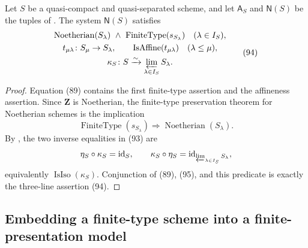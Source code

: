 \begin{proposition}
  \label{prop:nagata-noetherian-inverse-system}
  \lean{}

  Let $S$ be a quasi-compact and quasi-separated scheme, and let
  $\mathsf A_S$ and $\mathsf N(S)$ be the tuples of
  .  The system
  \(\mathsf N(S)\) satisfies
  \[
  \begin{gathered}
    \operatorname{Noetherian}(S_\lambda)
      \ \wedge\ \operatorname{FiniteType}(s_{S_\lambda})
      \quad(\lambda\in I_S),\\
    t_{\mu\lambda}\colon S_\mu\to S_\lambda,\qquad
      \operatorname{IsAffine}(t_{\mu\lambda})
      \quad(\lambda\leq\mu),\\
    \kappa_S\colon S\xrightarrow{\sim}
      \varprojlim_{\lambda\in I_S}S_\lambda.
  \end{gathered}                                                     \tag{94}
  \]
\end{proposition}

\begin{proof}
  Equation (89) contains the first finite-type assertion and the affineness
  assertion.  Since \(\mathbf Z\) is Noetherian, the finite-type
  preservation theorem for Noetherian schemes is the implication
  \[
    \operatorname{FiniteType}(s_{S_\lambda})
      \Longrightarrow\operatorname{Noetherian}(S_\lambda).         \tag{95}
  \]
  By , the two inverse equalities in
  (93) are
  \[
    \eta_S\circ\kappa_S=\operatorname{id}_S,
    \qquad
    \kappa_S\circ\eta_S
      =\operatorname{id}_{\varprojlim_{\lambda\in I_S}S_\lambda},
  \]
  equivalently $\operatorname{IsIso}(\kappa_S)$.  Conjunction of (89), (95),
  and this predicate is exactly the three-line assertion (94).
\end{proof}
\subsection{Embedding a finite-type scheme into a finite-presentation model}

